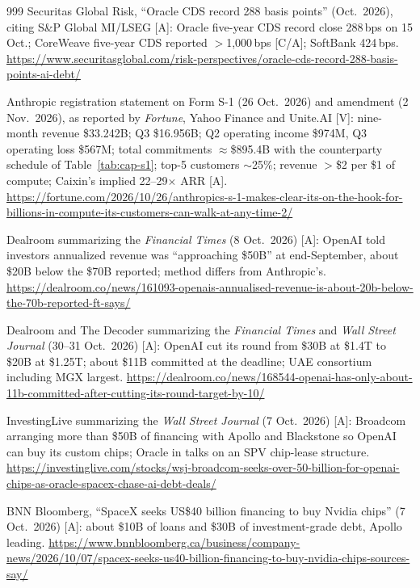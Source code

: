 \begin{thebibliography}{999}
 Securitas Global Risk, ``Oracle CDS record 288 basis points'' (Oct.\ 2026), citing S\&P Global MI/LSEG [A]: Oracle five-year CDS record close 288\,bps on 15 Oct.; CoreWeave five-year CDS reported $>$1,000\,bps [C/A]; SoftBank 424\,bps. \url{https://www.securitasglobal.com/risk-perspectives/oracle-cds-record-288-basis-points-ai-debt/}

 Anthropic registration statement on Form S-1 (26 Oct.\ 2026) and amendment (2 Nov.\ 2026), as reported by \emph{Fortune}, Yahoo Finance and Unite.AI [V]: nine-month revenue \$33.242B; Q3 \$16.956B; Q2 operating income \$974M, Q3 operating loss \$567M; total commitments $\approx$\$895.4B with the counterparty schedule of Table~\ref{tab:cap-s1}; top-5 customers $\sim$25\%; revenue $>$\$2 per \$1 of compute; Caixin's implied 22--29$\times$ ARR [A]. \url{https://fortune.com/2026/10/26/anthropics-s-1-makes-clear-its-on-the-hook-for-billions-in-compute-its-customers-can-walk-at-any-time-2/}

 Dealroom summarizing the \emph{Financial Times} (8 Oct.\ 2026) [A]: OpenAI told investors annualized revenue was ``approaching \$50B'' at end-September, about \$20B below the \$70B reported; method differs from Anthropic's. \url{https://dealroom.co/news/161093-openais-annualised-revenue-is-about-20b-below-the-70b-reported-ft-says/}

 Dealroom and The Decoder summarizing the \emph{Financial Times} and \emph{Wall Street Journal} (30--31 Oct.\ 2026) [A]: OpenAI cut its round from \$30B at \$1.4T to \$20B at \$1.25T; about \$11B committed at the deadline; UAE consortium including MGX largest. \url{https://dealroom.co/news/168544-openai-has-only-about-11b-committed-after-cutting-its-round-target-by-10/}

 InvestingLive summarizing the \emph{Wall Street Journal} (7 Oct.\ 2026) [A]: Broadcom arranging more than \$50B of financing with Apollo and Blackstone so OpenAI can buy its custom chips; Oracle in talks on an SPV chip-lease structure. \url{https://investinglive.com/stocks/wsj-broadcom-seeks-over-50-billion-for-openai-chips-as-oracle-spacex-chase-ai-debt-deals/}

 BNN Bloomberg, ``SpaceX seeks US\$40 billion financing to buy Nvidia chips'' (7 Oct.\ 2026) [A]: about \$10B of loans and \$30B of investment-grade debt, Apollo leading. \url{https://www.bnnbloomberg.ca/business/company-news/2026/10/07/spacex-seeks-us40-billion-financing-to-buy-nvidia-chips-sources-say/}


\end{thebibliography}
